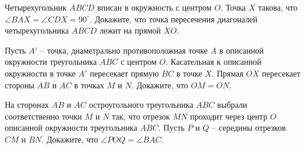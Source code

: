 \begin{problems}
\item Четырехугольник $ABCD$ вписан в окружность с центром $O$. Точка $X$ такова, что $\angle BAX = \angle CDX = 90^{\circ}$. Докажите, что точка пересечения диагоналей четырехугольника $ABCD$ лежит на прямой $XO$.



\item Пусть $A'$ -- точка, диаметрально противоположная точке $A$ в описанной окружности треугольника $ABC$ с центром $O$. Касательная к описанной окружности в точке $A'$ пересекает прямую $BC$ в точке $X$. Прямая $OX$ пересекает стороны $AB$ и $AC$ в точках $M$ и $N$. Докажите, что $OM = ON$.

\item На сторонах $AB$ и $AC$ остроугольного треугольника $ABC$ выбрали соответственно точки $M$ и $N$ так, что отрезок $MN$ проходит через центр $O$ описанной окружности треугольника $ABC$. Пусть $P$ и $Q$ -- середины отрезков $CM$ и $BN$. Докажите, что $\angle POQ = \angle BAC$.









\end{problems}